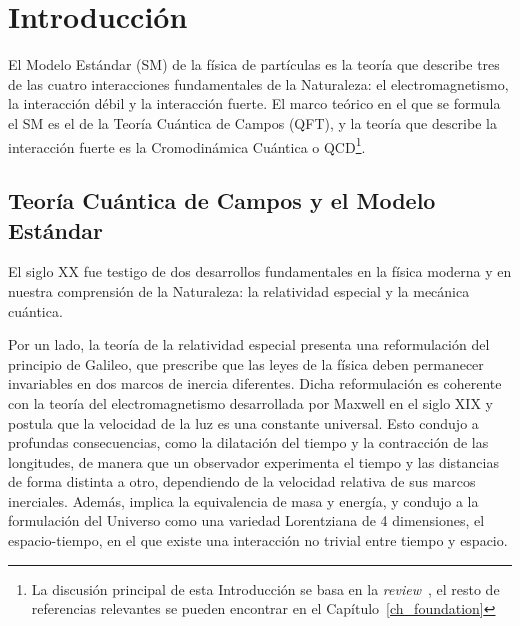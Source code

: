 \chapter*{Introducci\'on}


El Modelo Estándar (SM) de la física de partículas es la teoría que describe tres de las cuatro interacciones fundamentales de la Naturaleza: el electromagnetismo, la interacción débil y la interacción fuerte. El marco teórico en el que se formula el SM es el de la Teoría Cuántica de Campos (QFT), y la teoría que describe la interacción fuerte es la Cromodinámica Cuántica o QCD\footnote{La discusión principal de esta Introducción se basa en la \textit{review}~\citep{Wilczek:1998ma}, el resto de referencias relevantes se pueden encontrar en el Capítulo~\ref{ch_foundation}}.

\section*{Teoría Cuántica de Campos y el Modelo Estándar}

El siglo XX fue testigo de dos desarrollos fundamentales en la física moderna y en nuestra comprensión de la Naturaleza: la relatividad especial y la mecánica cuántica. 

Por un lado, la teoría de la relatividad especial presenta una reformulación del principio de Galileo, que prescribe que las leyes de la física deben permanecer invariables en dos marcos de inercia diferentes. Dicha reformulación es coherente con la teoría del electromagnetismo desarrollada por Maxwell en el siglo XIX y postula que la velocidad de la luz es una constante universal. Esto condujo a profundas consecuencias, como la dilatación del tiempo y la contracción de las longitudes, de manera que un observador experimenta el tiempo y las distancias de forma distinta a otro, dependiendo de la velocidad relativa de sus marcos inerciales. Además, implica la equivalencia de masa y energía, y condujo a la formulación del Universo como una variedad Lorentziana de 4 dimensiones, el espacio-tiempo, en el que existe una interacción no trivial entre tiempo y espacio.

